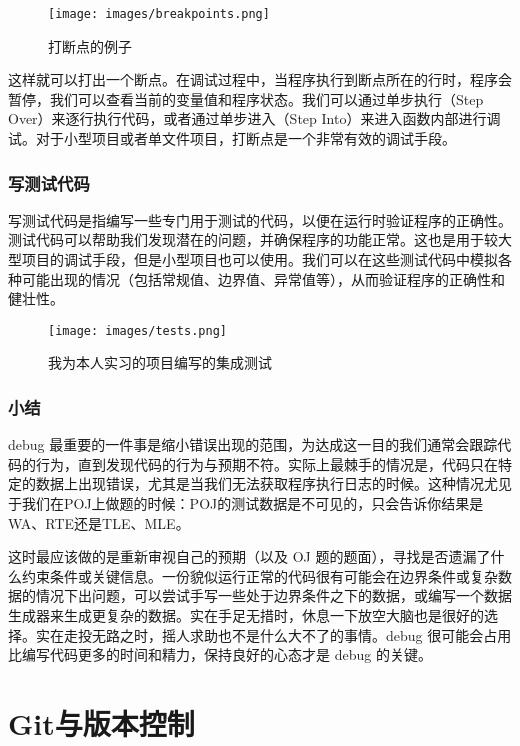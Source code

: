 \documentclass[../main.tex]{subfiles}
\begin{document}
\begin{figure}[ht]
  \centering
  \texttt{[image: images/breakpoints.png]}
  \caption{打断点的例子}
\end{figure}

这样就可以打出一个断点。在调试过程中，当程序执行到断点所在的行时，程序会暂停，我们可以查看当前的变量值和程序状态。我们可以通过单步执行（Step Over）来逐行执行代码，或者通过单步进入（Step Into）来进入函数内部进行调试。对于小型项目或者单文件项目，打断点是一个非常有效的调试手段。

\subsubsection{写测试代码}

写测试代码是指编写一些专门用于测试的代码，以便在运行时验证程序的正确性。测试代码可以帮助我们发现潜在的问题，并确保程序的功能正常。这也是用于较大型项目的调试手段，但是小型项目也可以使用。我们可以在这些测试代码中模拟各种可能出现的情况（包括常规值、边界值、异常值等），从而验证程序的正确性和健壮性。

\begin{figure}[ht]
  \centering
  \texttt{[image: images/tests.png]}
  \caption{我为本人实习的项目编写的集成测试}
\end{figure}

\subsubsection{小结}

debug 最重要的一件事是缩小错误出现的范围，为达成这一目的我们通常会跟踪代码的行为，直到发现代码的行为与预期不符。实际上最棘手的情况是，代码只在特定的数据上出现错误，尤其是当我们无法获取程序执行日志的时候。这种情况尤见于我们在POJ上做题的时候：POJ的测试数据是不可见的，只会告诉你结果是WA、RTE还是TLE、MLE。

这时最应该做的是重新审视自己的预期（以及 OJ 题的题面），寻找是否遗漏了什么约束条件或关键信息。一份貌似运行正常的代码很有可能会在边界条件或复杂数据的情况下出问题，可以尝试手写一些处于边界条件之下的数据，或编写一个数据生成器来生成更复杂的数据。实在手足无措时，休息一下放空大脑也是很好的选择。实在走投无路之时，摇人求助也不是什么大不了的事情。debug 很可能会占用比编写代码更多的时间和精力，保持良好的心态才是 debug 的关键。

\section{Git与版本控制}
\end{document}
